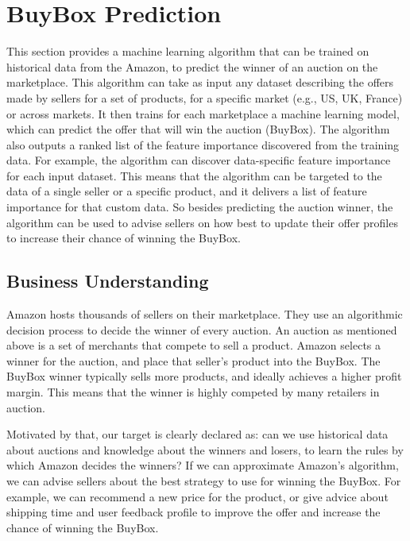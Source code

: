 \section{BuyBox Prediction}
\label{sec:buybox}
This section provides a machine learning algorithm that can be trained on historical data from the Amazon, to predict the winner of an auction on the marketplace. This algorithm can take as input any dataset describing the offers made by sellers for a set of products, for a specific market (e.g., US, UK, France) or across markets. It then trains for each marketplace a machine learning model, which can predict the offer that will win the auction (BuyBox). The algorithm also outputs a ranked list of the feature importance discovered from the training data. For example, the algorithm can discover data-specific feature importance for each input dataset. This means that the algorithm can be targeted to the data of a single seller or a specific product, and it delivers a list of feature importance for that custom data. So besides predicting the auction winner, the algorithm can be used to advise sellers on how best to update their offer profiles to increase their chance of winning the BuyBox.

\subsection{Business Understanding}
\label{sec:bbbusiness}
Amazon hosts thousands of sellers on their marketplace. They use an algorithmic decision process to decide the winner of every auction. An auction as mentioned above is a set of merchants that compete to sell a product. Amazon selects a winner for the auction, and place that seller's product into the BuyBox. The BuyBox winner typically sells more products, and ideally achieves a higher profit margin. This means that the winner is highly competed by many retailers in auction.

Motivated by that, our target is clearly declared as: can we use historical data about auctions and knowledge about the winners and losers, to learn the rules by which Amazon decides the winners? If we can approximate Amazon’s algorithm, we can advise sellers about the best strategy to use for winning the BuyBox. For example, we can recommend a new price for the product, or give advice about shipping time and user feedback profile to improve the offer and increase the chance of winning the BuyBox. 

